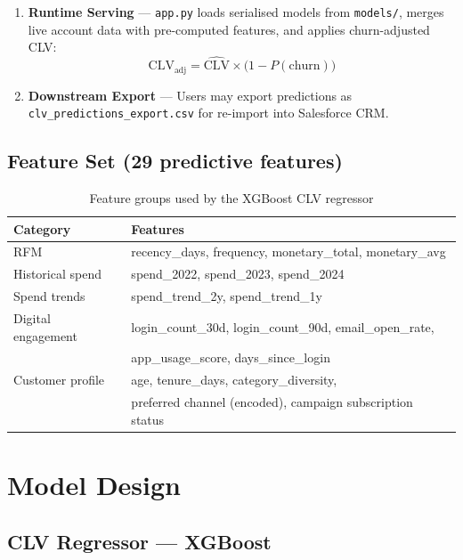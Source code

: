 \documentclass[11pt,a4paper]{article}
\begin{document}
\begin{enumerate}[leftmargin=1.5cm]
  \item \textbf{Runtime Serving} — \texttt{app.py} loads serialised models from
    \texttt{models/}, merges live account data with pre-computed features, and
    applies churn-adjusted CLV:
    \[
      \text{CLV}_{\text{adj}} = \hat{\text{CLV}} \times \bigl(1 - P(\text{churn})\bigr)
    \]

  \item \textbf{Downstream Export} — Users may export predictions as
    \texttt{clv\_predictions\_export.csv} for re-import into Salesforce CRM.
\end{enumerate}

\subsection{Feature Set (29 predictive features)}

\begin{table}[H]
\centering\small
\begin{tabular}{ll}
\toprule
\textbf{Category} & \textbf{Features} \\
\midrule
RFM            & recency\_days, frequency, monetary\_total, monetary\_avg \\
Historical spend & spend\_2022, spend\_2023, spend\_2024 \\
Spend trends   & spend\_trend\_2y, spend\_trend\_1y \\
Digital engagement & login\_count\_30d, login\_count\_90d, email\_open\_rate, \\
                   & app\_usage\_score, days\_since\_login \\
Customer profile & age, tenure\_days, category\_diversity, \\
                 & preferred channel (encoded), campaign subscription status \\
\bottomrule
\end{tabular}
\caption{Feature groups used by the XGBoost CLV regressor}
\end{table}

\section{Model Design}

\subsection{CLV Regressor — XGBoost}
\end{document}
